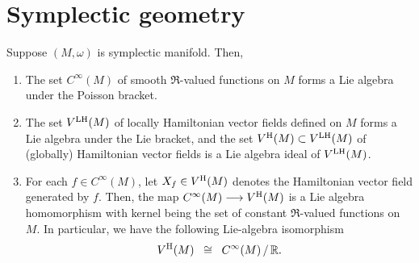 

\chapter{Symplectic geometry}
\setcounter{theorem}{0}
\setcounter{equation}{0}


\renewcommand{\theenumi}{\roman{enumi}}
\renewcommand{\labelenumi}{\textnormal{(\theenumi)}$\;\;$}


\begin{theorem}
\mbox{}
\vskip 0.2cm
\noindent
Suppose $(M,\omega)$ is symplectic manifold. Then,
\begin{enumerate}
\item
	The set $C^{\infty}(M)$ of smooth $\Re$-valued functions on $M$
	forms a Lie algebra under the Poisson bracket.
\item
	The set $V^{\textnormal{LH}}(M)$ of locally Hamiltonian vector fields defined on $M$
	forms a Lie algebra under the Lie bracket, and
	the set $V^{\textnormal{H}}(M) \subset V^{\textnormal{LH}}(M)$ of (globally) Hamiltonian vector fields
	is a Lie algebra ideal of $V^{\textnormal{LH}}(M)$.
\item
	For each $f \in C^{\infty}(M)$, let $X_{f} \in V^{\textnormal{H}}(M)$ denotes the Hamiltonian vector field generated by $f$.
	Then, the map $C^{\infty}(M) \longrightarrow V^{\textnormal{H}}(M)$ is a Lie algebra homomorphism
	with kernel being the set of constant $\Re$-valued functions on $M$.
	In particular, we have the following Lie-algebra isomorphism
	\begin{equation*}
	V^{\textnormal{H}}(M) \;\; \cong \;\; C^{\infty}(M) \,/\, \Re.
	\end{equation*}
\end{enumerate}
\end{theorem}



